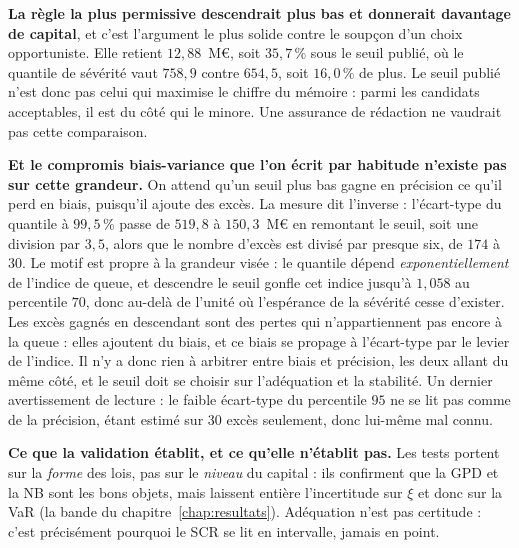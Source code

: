 \textbf{La règle la plus permissive descendrait plus bas et donnerait davantage de capital}, et
c'est l'argument le plus solide contre le soupçon d'un choix opportuniste. Elle retient
$12{,}88$~M\euro, soit $35{,}7\,\%$ sous le seuil publié, où le quantile de sévérité vaut
$758{,}9$ contre $654{,}5$, soit $16{,}0\,\%$ de plus. Le seuil publié n'est donc pas celui qui
maximise le chiffre du mémoire : parmi les candidats acceptables, il est du côté qui le minore.
Une assurance de rédaction ne vaudrait pas cette comparaison.

\begin{attention}
\textbf{Et le compromis biais-variance que l'on écrit par habitude n'existe pas sur cette
grandeur.} On attend qu'un seuil plus bas gagne en précision ce qu'il perd en biais, puisqu'il
ajoute des excès. La mesure dit l'inverse : l'écart-type du quantile à $99{,}5\,\%$ passe de
$519{,}8$ à $150{,}3$~M\euro{} en remontant le seuil, soit une division par $3{,}5$, alors que le
nombre d'excès est divisé par presque six, de $174$ à $30$. Le motif est propre à la grandeur
visée : le quantile dépend \emph{exponentiellement} de l'indice de queue, et descendre le seuil
gonfle cet indice jusqu'à $1{,}058$ au percentile $70$, donc au-delà de l'unité où l'espérance de
la sévérité cesse d'exister. Les excès gagnés en descendant sont des pertes qui n'appartiennent
pas encore à la queue : elles ajoutent du biais, et ce biais se propage à l'écart-type par le
levier de l'indice. Il n'y a donc rien à arbitrer entre biais et précision, les deux allant du
même côté, et le seuil doit se choisir sur l'adéquation et la stabilité. Un dernier avertissement
de lecture : le faible écart-type du percentile $95$ ne se lit pas comme de la précision, étant
estimé sur $30$ excès seulement, donc lui-même mal connu.
\end{attention}

\begin{cle}
\textbf{Ce que la validation établit, et ce qu'elle n'établit pas.} Les tests portent sur la
\emph{forme} des lois, pas sur le \emph{niveau} du capital : ils confirment que la GPD et la
NB sont les bons objets, mais laissent entière l'incertitude sur $\xi$ et donc sur la VaR (la
bande du chapitre~\ref{chap:resultats}). Adéquation n'est pas certitude : c'est précisément
pourquoi le SCR se lit en intervalle, jamais en point.
\end{cle}


